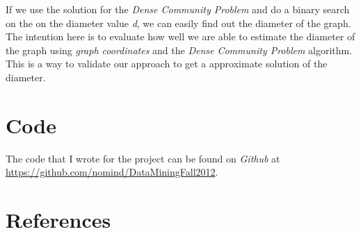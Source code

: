 \documentclass{article}
\begin{document}
            If we use the solution for the {\em Dense Community Problem} and do a binary search on the on the diameter value {\em d}, we can easily find out the diameter of the graph. The intention here is to evaluate how well we are able to estimate the diameter of the graph using {\em graph coordinates} and the {\em Dense Community Problem} algorithm. This is a way to validate our approach to get a approximate solution of the diameter.
            
    \section{Code}
    
        The code that I wrote for the project can be found on {\em Github} at \url{https://github.com/nomind/DataMiningFall2012}.
        
    \section{References}
     
        \printbibliography
    
\end{document}
